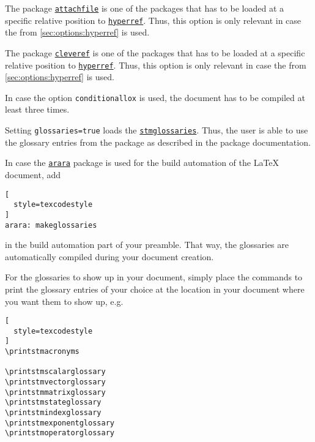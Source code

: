 \documentclass[%
  type=article,%
  layout=koma,%
  page=false,%
  cleveref=true,%
  conditionallox=true,%
  conditionalloxnewpage=true,%
  date=true,%
  glossaries=true,%
  hyperref=true,%
  index=true,%
  listings=true%
]{stmtext}
\newcommand{\stmlatexpackagelink}[1]{\href{https://github.com/raedma/stmlatex/blob/master/doc/#1/#1.pdf}{\texttt{#1}}}
\newcommand{\ctanpackagelink}[1]{\href{https://ctan.org/pkg/#1}{\texttt{#1}}}
\begin{document}
The package \ctanpackagelink{attachfile} is one of the packages that has to be loaded at a specific relative position to \ctanpackagelink{hyperref}. Thus, this option is only relevant in case the  from \cref{sec:options:hyperref} is used.

\label{sec:options:cleveref}

The package \ctanpackagelink{cleveref} is one of the packages that has to be loaded at a specific relative position to \ctanpackagelink{hyperref}. Thus, this option is only relevant in case the  from \cref{sec:options:hyperref} is used.



In case the option \texttt{conditionallox} is used, the document has to be compiled at least three times.




Setting \texttt{glossaries=true} loads the \stmlatexpackagelink{stmglossaries}. Thus, the user is able to use the glossary entries from the package as described in the package documentation.

In case the \ctanpackagelink{arara} package is used for the build automation of the \LaTeX{} document, add
\begin{lstlisting}[
  style=texcodestyle
]
arara: makeglossaries
\end{lstlisting}

in the build automation part of your preamble. That way, the glossaries are automatically compiled during your document creation.

For the glossaries to show up in your document, simply place the commands to print the glossary entries of your choice at the location in your document where you want them to show up, e.g.

\begin{lstlisting}[
  style=texcodestyle
]
\printstmacronyms

\printstmscalarglossary
\printstmvectorglossary
\printstmmatrixglossary
\printstmstateglossary
\printstmindexglossary
\printstmexponentglossary
\printstmoperatorglossary
\end{lstlisting}
\end{document}
